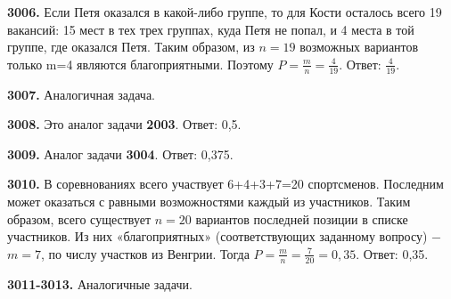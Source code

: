 \textbf{3006.} Если Петя оказался в какой-либо группе, то для Кости осталось всего 19 вакансий: 15 мест в тех трех группах, куда Петя не попал, и 4 места в той группе, где оказался Петя. Таким образом, из $n=19$ возможных вариантов только m=4 являются благоприятными. Поэтому $P=\frac{m}{n}=\frac{4}{19}.$ \newline \null \hspace*{\fill} Ответ: $\frac{4}{19}.$ 

\textbf{3007.} Аналогичная задача.

\textbf{3008.} Это аналог задачи \textbf{2003}. \null \hspace*{\fill} Ответ: 0,5. 

\textbf{3009.} Аналог задачи \textbf{3004}.\newline \null \hspace*{\fill} Ответ: 0,375. 

\textbf{3010.} В соревнованиях всего участвует 6+4+3+7=20 спортсменов. Последним может оказаться с равными возможностями каждый из участников. Таким образом, всего существует $n=20$ вариантов последней позиции в списке участников. Из них «благоприятных» (соответствующих заданному вопросу) $-$ $m=7$, по числу участков из Венгрии. Тогда $P = \frac{m}{n}=\frac{7}{20}=0,35.$\newline \null \hspace*{\fill} Ответ: 0,35. 

\textbf{3011-3013.} Аналогичные задачи.

